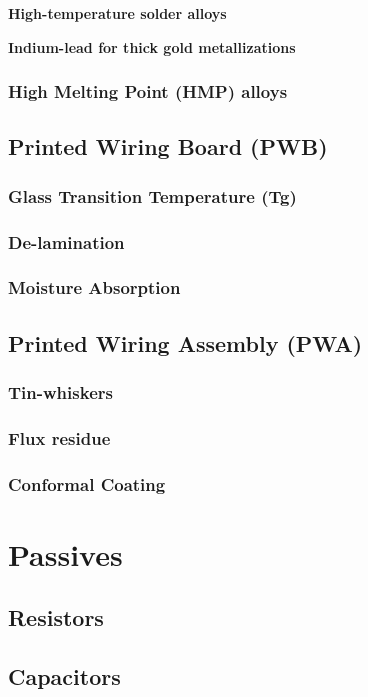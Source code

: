 \documentclass{article}
\begin{document}
		
		\textbf{High-temperature solder alloys}
		
		
		\textbf{Indium-lead for thick gold metallizations}
		
		
		\subsubsection{High Melting Point (HMP) alloys}
	
	\subsection{Printed Wiring Board (PWB)}
		\subsubsection{Glass Transition Temperature (Tg)}
		\subsubsection{De-lamination}
		\subsubsection{Moisture Absorption}

	\subsection{Printed Wiring Assembly (PWA)}
		\subsubsection{Tin-whiskers}
		\subsubsection{Flux residue}
		\subsubsection{Conformal Coating}

\newpage

\section{Passives}
	\subsection{Resistors}
	
	\subsection{Capacitors}
	
\end{document}
